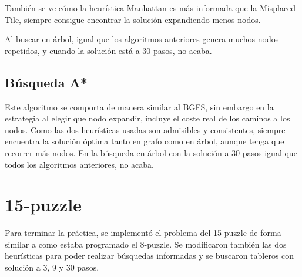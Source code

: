 \documentclass{article}
\begin{document}
También se ve cómo la heurística Manhattan es más informada que la Misplaced Tile, siempre consigue encontrar la solución expandiendo menos nodos.

Al buscar en árbol, igual que los algoritmos anteriores genera muchos nodos repetidos, y cuando la solución está a 30 pasos, no acaba.

\subsection{Búsqueda A*}
Este algoritmo se comporta de manera similar al BGFS, sin embargo en la estrategia al elegir que nodo expandir, incluye el coste real de los caminos a los nodos. Como las dos heurísticas usadas son admisibles y consistentes, siempre encuentra la solución óptima tanto en grafo como en árbol, aunque tenga que recorrer más nodos. En la búsqueda en árbol con la solución a 30 pasos igual que todos los algoritmos anteriores, no acaba.


\section{15-puzzle}
Para terminar la práctica, se implementó el problema del 15-puzzle de forma similar a como estaba programado el 8-puzzle. Se modificaron también las dos heurísticas para poder realizar búsquedas informadas y se buscaron tableros con solución a 3, 9 y 30 pasos.
\end{document}
